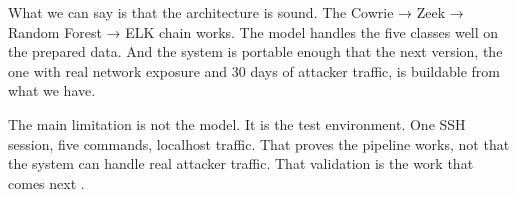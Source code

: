 What we can say is that the architecture is sound. The Cowrie → Zeek → Random Forest → ELK chain works. The model handles the five classes well on the prepared data. And the system is portable enough that the next version, the one with real network exposure and 30 days of attacker traffic, is buildable from what we have.

The main limitation is not the model. It is the test environment. One SSH session, five commands, localhost traffic. That proves the pipeline works, not that the system can handle real attacker traffic. That validation is the work that comes next \cite{famera2025mirai,rodriguezgomez2025systematic}.
